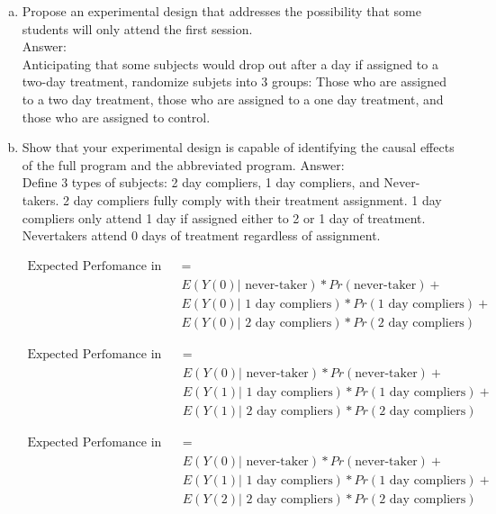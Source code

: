 \documentclass[11pt,notitlepage]{article}\usepackage[]{graphicx}\usepackage[]{color}
\begin{document}
\begin{enumerate}[a)]
\item Propose an experimental design that addresses the possibility that some students
will only attend the first session.\\
Answer:\\
Anticipating that some subjects would drop out after a day if assigned to a two-day treatment, randomize subjets into 3 groups:  Those who are assigned to a two day treatment, those who are assigned to a one day treatment, and those who are assigned to control.  

\item Show that your experimental design is capable of identifying the causal effects of the
full program and the abbreviated program.
Answer:\\
Define 3 types of subjects: 2 day compliers, 1 day compliers, and Never-takers.  2 day compliers fully comply with their treatment assignment.  1 day compliers only attend 1 day if assigned either to 2 or 1 day of treatment.  Nevertakers attend 0 days of treatment regardless of assignment.

\begin{align*}
\text{Expected Perfomance in Control (EP, Control)} &= \\
&E(Y(0)|\text{ never-taker})*Pr(\text{never-taker}) + \\
&E(Y(0)|\text{ 1 day compliers})*Pr(\text{1 day compliers}) + \\
&E(Y(0)|\text{ 2 day compliers})*Pr(\text{2 day compliers})
\end{align*}

\begin{align*}
\text{Expected Perfomance in 1-day group (EP, 1-day)} &= \\
&E(Y(0)|\text{ never-taker})*Pr(\text{never-taker}) + \\
&E(Y(1)|\text{ 1 day compliers})*Pr(\text{1 day compliers}) + \\
&E(Y(1)|\text{ 2 day compliers})*Pr(\text{2 day compliers})
\end{align*}

\begin{align*}
\text{Expected Perfomance in 2-day group (EP, 2-day)} &= \\
&E(Y(0)|\text{ never-taker})*Pr(\text{never-taker}) + \\
&E(Y(1)|\text{ 1 day compliers})*Pr(\text{1 day compliers}) + \\
&E(Y(2)|\text{ 2 day compliers})*Pr(\text{2 day compliers})
\end{align*}


\end{enumerate}
\end{document}
